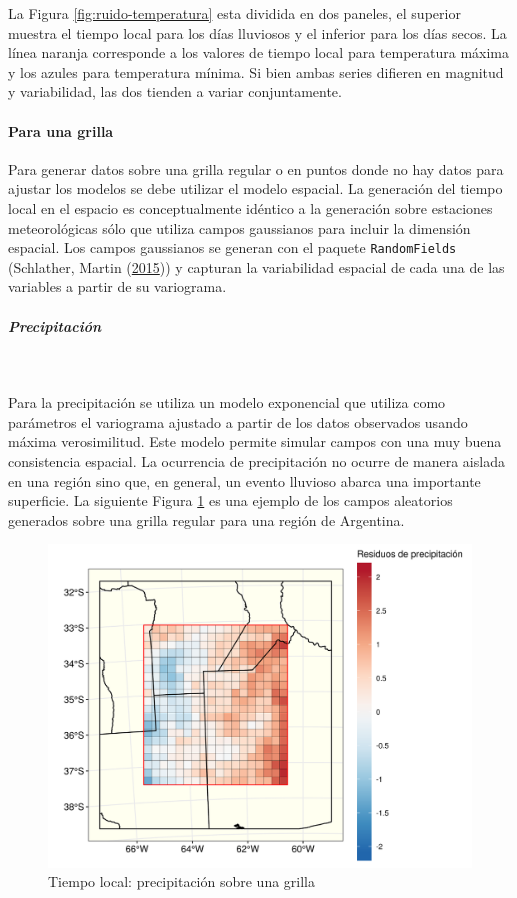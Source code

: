 \documentclass[
  12pt]{article}
\begin{document}
La Figura \ref{fig:ruido-temperatura} esta dividida en dos paneles, el superior muestra el tiempo local para los días lluviosos y el inferior para los días secos. La línea naranja corresponde a los valores de tiempo local para temperatura máxima y los azules para temperatura mínima. Si bien ambas series difieren en magnitud y variabilidad, las dos tienden a variar conjuntamente.

\hypertarget{para-una-grilla}{%
\paragraph{Para una grilla}\label{para-una-grilla}}

Para generar datos sobre una grilla regular o en puntos donde no hay datos para ajustar los modelos se debe utilizar el modelo espacial. La generación del tiempo local en el espacio es conceptualmente idéntico a la generación sobre estaciones meteorológicas sólo que utiliza campos gaussianos para incluir la dimensión espacial. Los campos gaussianos se generan con el paquete \texttt{RandomFields} (Schlather, Martin (\protect\hyperlink{ref-RN4406}{2015})) y capturan la variabilidad espacial de cada una de las variables a partir de su variograma.

\hypertarget{precipitaciuxf3n-1}{%
\subparagraph{Precipitación}\label{precipitaciuxf3n-1}}

~

Para la precipitación se utiliza un modelo exponencial que utiliza como parámetros el variograma ajustado a partir de los datos observados usando máxima verosimilitud. Este modelo permite simular campos con una muy buena consistencia espacial. La ocurrencia de precipitación no ocurre de manera aislada en una región sino que, en general, un evento lluvioso abarca una importante superficie. La siguiente Figura \ref{fig:random-field-precipitacion} es una ejemplo de los campos aleatorios generados sobre una grilla regular para una región de Argentina.

\begin{figure}[H]

{\centering \includegraphics[width=0.75\linewidth]{./docs/figures/random_field_precipitacion} 

}

\caption{Tiempo local: precipitación sobre una grilla}\label{fig:random-field-precipitacion}
\end{figure}
\end{document}
